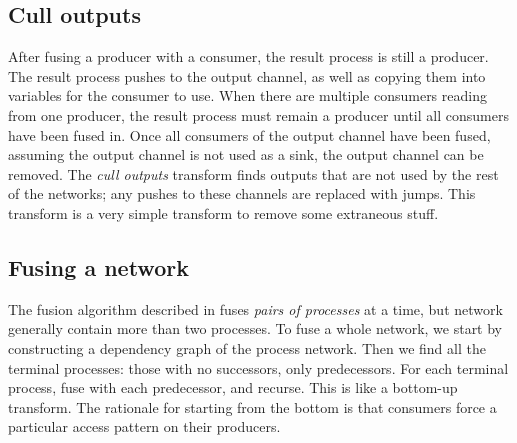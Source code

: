\subsection{Cull outputs}
After fusing a producer with a consumer, the result process is still a producer.
The result process pushes to the output channel, as well as copying them into variables for the consumer to use.
When there are multiple consumers reading from one producer, the result process must remain a producer until all consumers have been fused in.
Once all consumers of the output channel have been fused, assuming the output channel is not used as a sink, the output channel can be removed.
The \emph{cull outputs} transform finds outputs that are not used by the rest of the networks; any pushes to these channels are replaced with jumps.
This transform is a very simple transform to remove some extraneous stuff.


\subsection{Fusing a network}
The fusion algorithm described in  fuses \emph{pairs of processes} at a time, but network generally contain more than two processes.
To fuse a whole network, we start by constructing a dependency graph of the process network.
Then we find all the terminal processes: those with no successors, only predecessors.
For each terminal process, fuse with each predecessor, and recurse.
This is like a bottom-up transform.
The rationale for starting from the bottom is that consumers force a particular access pattern on their producers.



